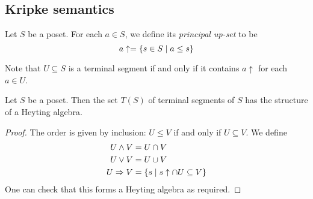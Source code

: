 \subsection{Kripke semantics}
\begin{definition}
    Let \( S \) be a poset.
    For each \( a \in S \), we define its \emph{principal up-set} to be
    \[ a \uparrow = \qty{s \in S \mid a \leq s} \]
\end{definition}
Note that \( U \subseteq S \) is a terminal segment if and only if it contains \( a \uparrow \) for each \( a \in U \).
\begin{proposition}
    Let \( S \) be a poset.
    Then the set \( T(S) \) of terminal segments of \( S \) has the structure of a Heyting algebra.
\end{proposition}
\begin{proof}
    The order is given by inclusion: \( U \leq V \) if and only if \( U \subseteq V \).
    We define
    \begin{align*}
        U \wedge V &= U \cap V \\
        U \vee V &= U \cup V \\
        U \Rightarrow V &= \qty{s \mid s \uparrow \cap U \subseteq V}
    \end{align*}
    One can check that this forms a Heyting algebra as required.
\end{proof}
